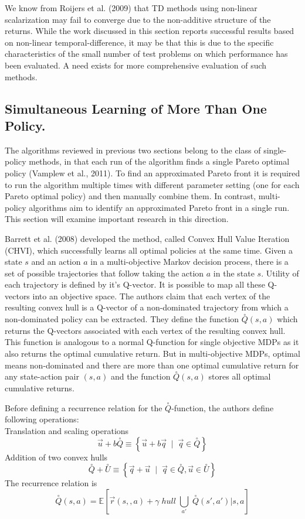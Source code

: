 We know from Roijers et al. (2009)\nocite{roijers2013survey} that TD methods using non-linear scalarization may fail to converge due to the non-additive structure of the returns. While the work discussed in this section reports successful results based on non-linear temporal-difference, it may be that this is due to the specific characteristics of the small number of test problems on which performance has been evaluated. A need exists for more comprehensive evaluation of such methods.

\subsection{Simultaneous Learning of More Than One Policy.}

The algorithms reviewed in previous two sections belong to the class of single-policy methods, in that each run of the algorithm finds a single Pareto optimal policy (Vamplew et al., 2011\nocite{vamplew2011empirical}). To find an approximated Pareto front it is required to run the algorithm multiple times with different parameter setting (one for each Pareto optimal policy) and then manually combine them. In contrast, multi-policy algorithms aim to identify an approximated Pareto front in a single run. This section will examine important research in this direction.

Barrett et al. (2008) \nocite{barrett2008learning} developed the method, called Convex Hull Value Iteration (CHVI), which successfully learns all optimal policies at the same time. Given a state $s$ and an action $a$ in a multi-objective Markov decision process, there is a set of possible trajectories that follow taking the action $a$ in the state $s$. Utility of each trajectory is defined by it's Q-vector. It is possible to map all these Q-vectors into an objective space. The authors claim that each vertex of the resulting convex hull is a Q-vector of a non-dominated trajectory from which a non-dominated policy can be extracted. They define the function $\overset{\circ}{Q}(s,a)$ which returns the Q-vectors associated with each vertex of the resulting convex hull. This function is analogous to a normal Q-function for single objective MDPs as it also returns the optimal cumulative return. But in multi-objective MDPs, optimal means non-dominated and there are more than one optimal cumulative return for any state-action pair $(s,a)$ and the function $\overset{\circ}{Q}(s,a)$ stores all optimal cumulative returns.

Before defining a recurrence relation for the $\overset{\circ}{Q}$-function, the authors define following operations:\\
Translation and scaling operations
$$ \vec{u}+b\overset{\circ}{Q}  \equiv \left\{ \vec{u} + b\vec{q} \;\;|\;\; \vec{q} \in \overset{\circ}{Q} \right\} $$
Addition of two convex hulls
$$ \overset{\circ}{Q} + \overset{\circ}{U} \equiv \left\{ \vec{q} + \vec{u} \;\;|\;\; \vec{q} \in \overset{\circ}{Q},\vec{u} \in \overset{\circ}{U} \right\} $$
The recurrence relation is
$$ \overset{\circ}{Q}(s,a) = \mathbb{E}\left[ \vec{r}(s,,a) + \gamma \; hull \; \underset{a'}{\bigcup} \; \overset{\circ}{Q}(s',a') | s,a \right] $$


